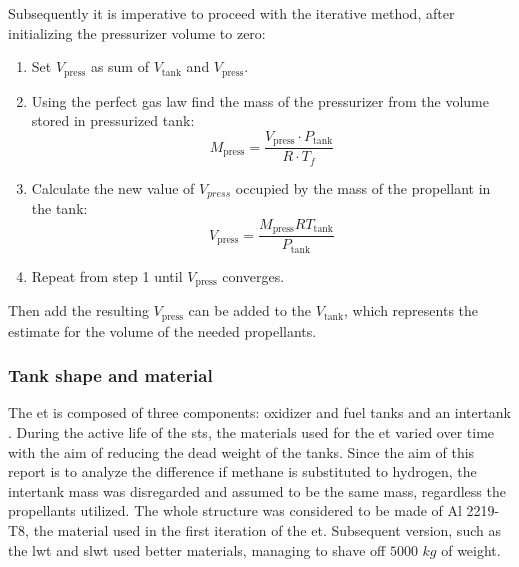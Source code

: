 Subsequently it is imperative to proceed with the iterative method, after initializing the pressurizer volume to zero:
\begin{enumerate}
    \item Set $V_{\text{press}}$ as sum of $V_{\text{tank}}$ and $V_{\text{press}}$.
    \item Using the perfect gas law find the mass of the pressurizer from the volume stored in pressurized tank:
    \begin{equation}
        M_{\text{press}} = \frac{V_{\text{press}} \cdot P_{\text{tank}}}{R \cdot T_f }
    \end{equation}
    \item Calculate the new value of $V_{press}$ occupied by the mass of the propellant in the tank:
    \begin{equation}
        V_{\text{press}} = \frac{M_{\text{press}} R T_{\text{tank}}}{P_{\text{tank}}} 
    \end{equation}
    \item Repeat from step 1 until $V_{\text{press}}$ converges.
\end{enumerate}
Then add the resulting $V_{\text{press}}$ can be added to the $V_{\text{tank}}$, which represents the estimate for the volume of the needed propellants. 

\subsubsection{Tank shape and material}
The \acrlong{et} is composed of three components: oxidizer and fuel tanks and an intertank \cite{E_t}.
During the active life of the \acrshort{sts}, the materials used for the \acrlong{et} varied over time with the aim of reducing the dead weight of the tanks.
Since the aim of this report is to analyze the difference if methane is substituted to hydrogen, the intertank mass was disregarded and assumed to be the same mass, regardless the propellants utilized.
The whole structure was considered to be made of Al 2219-T8, the material used in the first iteration of the \acrlong{et}. Subsequent version, such as the \acrfull{lwt} and \acrfull{slwt} used better materials, managing to shave off $5000$ $kg$ of weight. 

